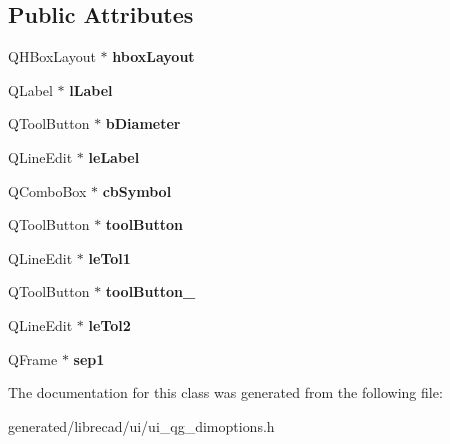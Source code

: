 \subsection*{Public Attributes}
\begin{DoxyCompactItemize}
\item 
\hypertarget{classUi__QG__DimOptions_aa6fe5e51ff170acb6ba39150c99b76e0}{Q\-H\-Box\-Layout $\ast$ {\bfseries hbox\-Layout}}\label{classUi__QG__DimOptions_aa6fe5e51ff170acb6ba39150c99b76e0}

\item 
\hypertarget{classUi__QG__DimOptions_a745608cb5d87d8e7a693fef279d964b4}{Q\-Label $\ast$ {\bfseries l\-Label}}\label{classUi__QG__DimOptions_a745608cb5d87d8e7a693fef279d964b4}

\item 
\hypertarget{classUi__QG__DimOptions_ab5ad35091ad91605166d11229b076335}{Q\-Tool\-Button $\ast$ {\bfseries b\-Diameter}}\label{classUi__QG__DimOptions_ab5ad35091ad91605166d11229b076335}

\item 
\hypertarget{classUi__QG__DimOptions_ae72ea59a4f4ad0842b9e81d66072ced2}{Q\-Line\-Edit $\ast$ {\bfseries le\-Label}}\label{classUi__QG__DimOptions_ae72ea59a4f4ad0842b9e81d66072ced2}

\item 
\hypertarget{classUi__QG__DimOptions_a08070406c316fbaed578ccd26ad887c2}{Q\-Combo\-Box $\ast$ {\bfseries cb\-Symbol}}\label{classUi__QG__DimOptions_a08070406c316fbaed578ccd26ad887c2}

\item 
\hypertarget{classUi__QG__DimOptions_affd6d5864de5c7e3cc5b3cf6887d6afa}{Q\-Tool\-Button $\ast$ {\bfseries tool\-Button}}\label{classUi__QG__DimOptions_affd6d5864de5c7e3cc5b3cf6887d6afa}

\item 
\hypertarget{classUi__QG__DimOptions_aaba2b8c89fe50be16950e415f8e8ca34}{Q\-Line\-Edit $\ast$ {\bfseries le\-Tol1}}\label{classUi__QG__DimOptions_aaba2b8c89fe50be16950e415f8e8ca34}

\item 
\hypertarget{classUi__QG__DimOptions_a2bf3ec1dd3ff79f52cfcd59fd84f6f64}{Q\-Tool\-Button $\ast$ {\bfseries tool\-Button\-\_}}\label{classUi__QG__DimOptions_a2bf3ec1dd3ff79f52cfcd59fd84f6f64}

\item 
\hypertarget{classUi__QG__DimOptions_a85f3eaafce9d2a0a65af561ffdc5ce2b}{Q\-Line\-Edit $\ast$ {\bfseries le\-Tol2}}\label{classUi__QG__DimOptions_a85f3eaafce9d2a0a65af561ffdc5ce2b}

\item 
\hypertarget{classUi__QG__DimOptions_a404607b5bb3af72f1ea74f45ebcf5d49}{Q\-Frame $\ast$ {\bfseries sep1}}\label{classUi__QG__DimOptions_a404607b5bb3af72f1ea74f45ebcf5d49}

\end{DoxyCompactItemize}


The documentation for this class was generated from the following file\-:\begin{DoxyCompactItemize}
\item 
generated/librecad/ui/ui\-\_\-qg\-\_\-dimoptions.\-h\end{DoxyCompactItemize}
